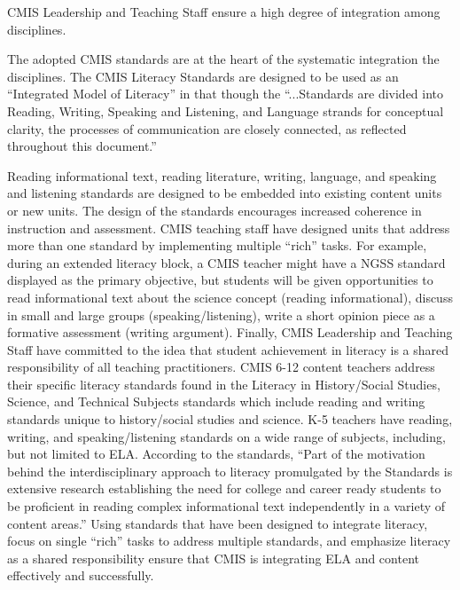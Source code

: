 \documentclass{report}
\begin{document}

\begin{findings}
CMIS Leadership and Teaching Staff ensure a high degree of integration among disciplines. 


The adopted CMIS standards are at the heart of the systematic  integration the disciplines. The CMIS Literacy Standards are designed to be used as an “Integrated Model of Literacy” in that though the “...Standards are divided into Reading, Writing, Speaking and Listening, and Language strands for conceptual clarity, the processes of communication are closely connected, as reflected throughout this document.” 

Reading informational text, reading literature, writing, language, and speaking and listening standards are designed to be embedded into existing content units or new units. The design of the standards encourages increased coherence in instruction and assessment. CMIS teaching staff have designed units that address more than one standard by implementing multiple “rich” tasks. For example, during an extended literacy block, a CMIS teacher might have a NGSS standard displayed as the primary objective, but students will be given opportunities to read informational text about the science concept (reading informational), discuss in small and large groups (speaking/listening), write a short opinion piece as a formative assessment (writing argument). Finally, CMIS Leadership and Teaching Staff have committed to the idea that student achievement in literacy is a shared responsibility of all teaching practitioners. CMIS 6-12 content teachers address their specific literacy standards found in the Literacy in History/Social Studies, Science, and Technical Subjects standards which include reading and writing standards unique to history/social studies and science. K-5 teachers have reading, writing, and speaking/listening standards on a wide range of subjects, including, but not limited to ELA. According to the standards, ``Part of the motivation behind the interdisciplinary approach to literacy promulgated by the Standards is extensive research establishing the need for college and career ready students to be proficient in reading complex informational text independently in a variety of content areas.'' Using standards that have been designed to integrate literacy, focus on single ``rich'' tasks to address multiple standards, and emphasize literacy as a shared responsibility ensure that CMIS is integrating ELA and content effectively and successfully. 


\end{findings}
\end{document}
